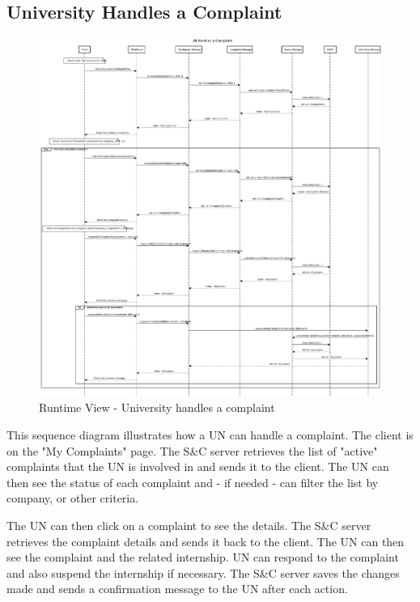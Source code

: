 
\subsection{University Handles a Complaint}
\label{sub:university-handles-a-complaint}%

\begin{figure}[H]
      \centering
      \includegraphics[width=1.0\textwidth]{Images/RV_13.pdf}
      \caption{Runtime View - University handles a complaint}
      \label{fig:rv-un-handles-complaint}
\end{figure}

\par This sequence diagram illustrates how a UN can handle a complaint. The client is on the "My Complaints" page. The
S\&C server retrieves the list of "active" complaints that the UN is involved in and sends it to the client. The UN can
then see the status of each complaint and - if needed - can filter the list by company, or other criteria.

\par The UN can then click on a complaint to see the details. The S\&C server retrieves the complaint details and sends
it back to the client. The UN can then see the complaint and the related internship. UN can respond to the complaint
and also suspend the internship if necessary. The S\&C server saves the changes made and sends a confirmation message
to the UN after each action.

